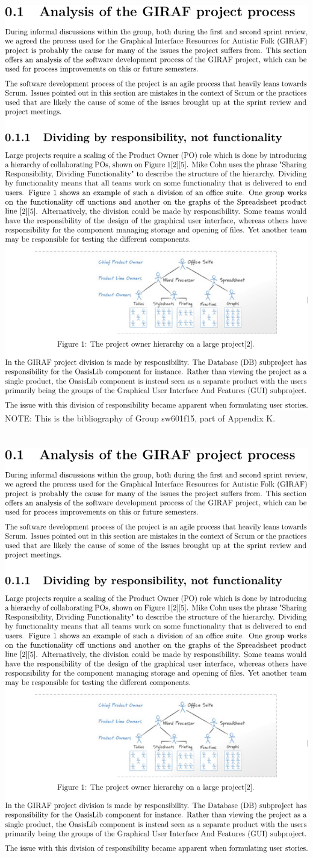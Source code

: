 \includegraphics[page=6,width=\textwidth]{part_appendix/sw601f15.pdf}
\newpage
\noindent\textsf{NOTE:} This is the bibliography of Group sw601f15, part of Appendix K\@.\\\\\\
\includegraphics[page=7,width=\textwidth]{part_appendix/sw601f15.pdf}